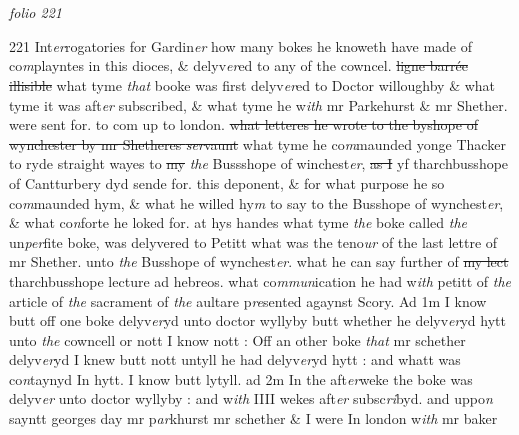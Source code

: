 \documentclass[12pt, a4paper]{book}
\begin{document}
\dotfill
					  \section*{}  \subsection*{}

\textit{folio 221}



{\color{Mahogany}221} Int\textit{er}rogatories for Gardin\textit{er} how many bokes he knoweth have made of co\textit{m}playntes in this dioces, \& delyv\textit{er}ed to any of the cowncel. \sout{ligne barrée illisible} what tyme \textit{that} booke was first 
			delyv\textit{er}ed to Doctor willoughby \& what tyme it was aft\textit{er} subscribed, \& what tyme he w\textit{ith }mr Parkehurst \& mr Shether. were sent for. to com up to london. \sout{what letteres he wrote to the byshope of wynchester by mr Shetheres \textit{ser}vaunt} what tyme he co\textit{m}maunded yonge Thacker to ryde straight wayes to \sout{my }
               \textit{the} Bussshope of winchest\textit{er}, \sout{as I} yf tharchbusshope of Cantturbery dyd sende for. this deponent, \& for what purpose he so co\textit{m}maunded hym, \& what he willed hy\textit{m} to say to the Busshope of  wynchest\textit{er}, \& what co\textit{n}forte he loked for. at hys handes what tyme \textit{the} boke called \textit{the} un\textit{per}fite boke, was delyvered to Petitt what was the teno\textit{ur} of the last lettre of mr Shether. unto \textit{the} Busshope of wynchest\textit{er}. what he can say further of \sout{my lect} tharchbusshope lecture ad hebreos. what co\textit{mmun}ication he had w\textit{ith} petitt of \textit{the} article of \textit{the} sacrament of \textit{the} aultare p\textit{re}sented agaynst Scory. Ad 1m I know butt off one boke delyv\textit{er}yd unto doctor wyllyby butt whether he delyv\textit{er}yd hytt unto \textit{the} cowncell or nott I know nott : Off an other boke \textit{that} mr schether delyv\textit{er}yd I knew butt nott untyll he had delyv\textit{er}yd hytt : and whatt was co\textit{n}taynyd In hytt. I know butt lytyll. ad 2m In the aft\textit{er}weke the boke was delyv\textit{er} unto doctor wyllyby : and w\textit{ith} IIII wekes aft\textit{er} subsc\textit{ri}byd. and uppo\textit{n} sayntt georges day mr p\textit{ar}khurst mr schether \& I were In london w\textit{ith} mr baker
\end{document}
